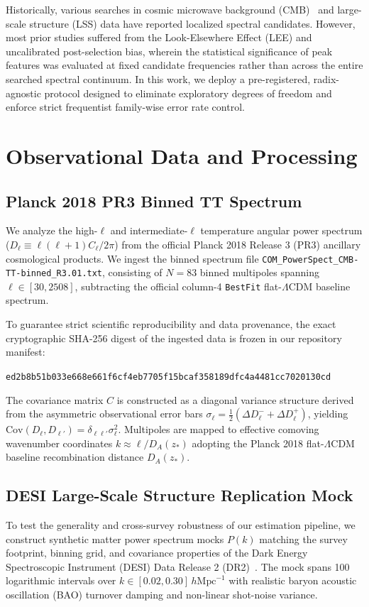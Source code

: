 Historically, various searches in cosmic microwave background (CMB)~\cite{planck2018} and large-scale structure (LSS) data have reported localized spectral candidates. However, most prior studies suffered from the Look-Elsewhere Effect (LEE) and uncalibrated post-selection bias, wherein the statistical significance of peak features was evaluated at fixed candidate frequencies rather than across the entire searched spectral continuum. In this work, we deploy a pre-registered, radix-agnostic protocol designed to eliminate exploratory degrees of freedom and enforce strict frequentist family-wise error rate control.

\section{Observational Data and Processing}
\subsection{Planck 2018 PR3 Binned TT Spectrum}
We analyze the high-$\ell$ and intermediate-$\ell$ temperature angular power spectrum ($D_\ell \equiv \ell(\ell+1)C_\ell/2\pi$) from the official Planck 2018 Release 3 (PR3) ancillary cosmological products. We ingest the binned spectrum file \texttt{COM\_PowerSpect\_CMB-TT-binned\_R3.01.txt}, consisting of $N = 83$ binned multipoles spanning $\ell \in [30, 2508]$, subtracting the official column-4 \texttt{BestFit} flat-$\Lambda$CDM baseline spectrum. 

To guarantee strict scientific reproducibility and data provenance, the exact cryptographic SHA-256 digest of the ingested data is frozen in our repository manifest:
\begin{center}
\texttt{ed2b8b51b033e668e661f6cf4eb7705f15bcaf358189dfc4a4481cc7020130cd}
\end{center}
The covariance matrix $C$ is constructed as a diagonal variance structure derived from the asymmetric observational error bars $\sigma_\ell = \frac{1}{2}(\Delta D_\ell^- + \Delta D_\ell^+)$, yielding $\mathrm{Cov}(D_\ell, D_{\ell'}) = \delta_{\ell \ell'} \sigma_\ell^2$. Multipoles are mapped to effective comoving wavenumber coordinates $k \approx \ell / D_A(z_*)$ adopting the Planck 2018 flat-$\Lambda$CDM baseline recombination distance $D_A(z_*)$.

\subsection{DESI Large-Scale Structure Replication Mock}
To test the generality and cross-survey robustness of our estimation pipeline, we construct synthetic matter power spectrum mocks $P(k)$ matching the survey footprint, binning grid, and covariance properties of the Dark Energy Spectroscopic Instrument (DESI) Data Release 2 (DR2)~\cite{desi2024}. The mock spans 100 logarithmic intervals over $k \in [0.02, 0.30]\,h\mathrm{Mpc}^{-1}$ with realistic baryon acoustic oscillation (BAO) turnover damping and non-linear shot-noise variance.

